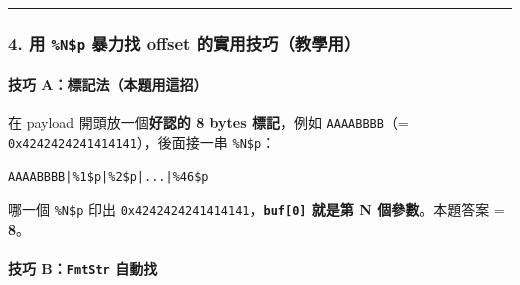 \documentclass[10pt,a4paper]{article}
\newenvironment{Shaded}{\begin{snugshade}}{\end{snugshade}}
\newcommand{\BuiltInTok}[1]{#1}
\newcommand{\CommentTok}[1]{\textcolor[rgb]{0.56,0.35,0.01}{\textit{#1}}}
\newcommand{\ControlFlowTok}[1]{\textcolor[rgb]{0.13,0.29,0.53}{\textbf{#1}}}
\newcommand{\DecValTok}[1]{\textcolor[rgb]{0.00,0.00,0.81}{#1}}
\newcommand{\KeywordTok}[1]{\textcolor[rgb]{0.13,0.29,0.53}{\textbf{#1}}}
\newcommand{\NormalTok}[1]{#1}
\newcommand{\OperatorTok}[1]{\textcolor[rgb]{0.81,0.36,0.00}{\textbf{#1}}}
\newcommand{\StringTok}[1]{\textcolor[rgb]{0.31,0.60,0.02}{#1}}
\renewenvironment{Shaded}{%
  \def\FrameCommand{\fboxsep=3.2pt\colorbox{shadecolor}}%
  \MakeFramed{\advance\hsize-\width\FrameRestore\small}%
}{%
  \endMakeFramed
}
\begin{document}
\begin{center}\rule{0.5\linewidth}{0.5pt}\end{center}

\subsubsection{\texorpdfstring{4. 用 \texttt{\%\allowbreak{}N\$\allowbreak{}p} 暴力找 offset
的實用技巧（教學用）}{4. 用 \%N\$p 暴力找 offset 的實用技巧（教學用）}}\label{ux7528-np-ux66b4ux529bux627e-offset-ux7684ux5be6ux7528ux6280ux5de7ux6559ux5b78ux7528}

\paragraph{技巧
A：標記法（本題用這招）}\label{ux6280ux5de7-aux6a19ux8a18ux6cd5ux672cux984cux7528ux9019ux62db}

在 payload 開頭放一個\textbf{好認的 8 bytes 標記}，例如
\texttt{AAAABBBB}（= \texttt{0x4242424241414141}），後面接一串
\texttt{\%\allowbreak{}N\$\allowbreak{}p}：

\begin{Verbatim}[breaklines=true,breakanywhere=true,breakautoindent=false,fontsize=\fontsize{7.0}{9.5}\selectfont]
AAAABBBB|%1$p|%2$p|...|%46$p
\end{Verbatim}

哪一個 \texttt{\%\allowbreak{}N\$\allowbreak{}p} 印出
\texttt{0x4242424241414141}，\textbf{\texttt{buf{[}0{]}} 就是第 N
個參數}。本題答案 = \textbf{8}。

\begin{Shaded}
\end{Shaded}

\paragraph{\texorpdfstring{技巧 B：\texttt{FmtStr}
自動找}{技巧 B：FmtStr 自動找}}\label{ux6280ux5de7-bfmtstr-ux81eaux52d5ux627e}
\end{document}

